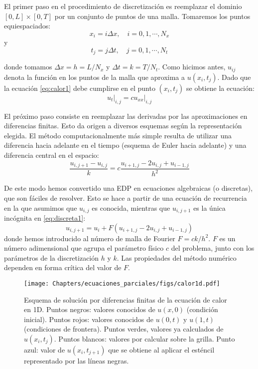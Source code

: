 El primer paso en el procedimiento de discretización es reemplazar el dominio $[0, L] \times [0, T]$ por un conjunto de puntos de una malla. Tomaremos los puntos equiespaciados:
\[ x_i = i \Delta x, \quad i = 0, 1, \cdots, N_x \]
y
\[ t_j = j \Delta t, \quad j = 0, 1, \cdots, N_t \]

donde tomamos $\Delta x = h = L/N_x$ y $\Delta t = k = T/N_t$. Como hicimos antes, $u_{ij}$ denota la función en los puntos de la malla que aproxima a $u(x_i, t_j)$. Dado que la ecuación \eqref{eq:calor1} debe cumplirse en el punto $(x_i, t_j)$ se obtiene la ecuación:
\begin{equation}
 u_t \Bigr|_{i,j} = c u_{xx}\Bigr|_{i,j}
\end{equation} 

El próximo paso consiste en reemplazar las derivadas por las aproximaciones en diferencias finitas. Esto da origen a diversos esquemas según la representación elegida. El método computacionalmente más simple resulta de utilizar una diferencia hacia adelante en el tiempo (esquema de Euler hacia adelante) y una diferencia central en el espacio:
\begin{equation} \label{eq:discreta1}
 \frac{u_{i,j+1} - u_{i,j}}{k} = c \frac{u_{i+1,j} - 2 u_{i,j} + u_{i-1, j}}{h ^2}
\end{equation} 

De este modo hemos convertido una EDP en ecuaciones algebraicas (o discretas), que son fáciles de resolver. Esto se hace a partir de una ecuación de recurrencia en la que asumimos que $u_{i,j}$ es conocida, mientras que $u_{i, j+1}$ es la única incógnita en \eqref{eq:discreta1}:
\begin{equation} \label{eq:recurrencia1}
 u_{i, j+1} = u_i + F(u_{i+1,j} - 2 u_{i,j} + u_{i-1, j})
\end{equation} 
donde hemos introducido al número de malla de Fourier $F = ck/h^2$. $F$ es un número adimensional que agrupa el parámetro físico $c$ del problema, junto con los parámetros de la discretización $h$ y $k$. Las propiedades del método numérico dependen en forma crítica del valor de $F$.

\begin{figure}[t]
 \centering
 \texttt{[image: Chapters/ecuaciones\_parciales/figs/calor1d.pdf]}
 \caption{Esquema de solución por diferencias finitas de la ecuación de calor en 1D. Puntos negros: valores conocidos de $u(x, 0)$ (condición inicial). Puntos rojos: valores conocidos de $u(0, t)$ y $u(1, t)$ (condiciones de frontera). Puntos verdes, valores ya calculados de $u(x_i, t_j)$. Puntos blancos: valores por calcular sobre la grilla. Punto azul: valor de $u(x_i, t_{j+1})$ que se obtiene al aplicar el esténcil representado por las líneas negras.}
 \label{fig:calor1d}
\end{figure}


